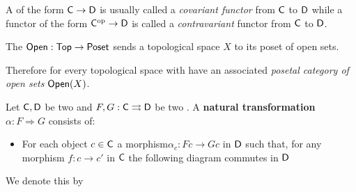 \documentclass[../main.tex]{subfiles}
\begin{document}
\begin{notation}
  A  of the form \(\mathsf{C} \to \mathsf{D}\) is usually called a \textit{covariant functor} from \(\mathsf{C}\) to \(\mathsf{D}\) while a functor of the form \(\mathsf{C}^{\operatorname*{op}} \to \mathsf{D}\) is called a \textit{contravariant} functor from \(\mathsf{C}\) to \(\mathsf{D}\).
\end{notation}


\begin{example} \label{ex:open-set-category}
  The  \(\mathsf{Open}: \mathsf{Top} \to \mathsf{Poset}\) sends a topological space \(X\) to its poset of open sets.

  Therefore for every topological space with have an associated \textit{posetal category of open sets} \(\mathsf{Open}(X)\).
\end{example}


\begin{definition} \label{def:natural-transformation}
  Let \(\mathsf{C}, \mathsf{D}\) be two  and \(F, G: \mathsf{C} \rightrightarrows \mathsf{D}\) be two .
  A \textbf{natural transformation} \(\alpha: F \Rightarrow G\) consists of:
  \begin{itemize}
    \item For each object \(c \in \mathsf{C}\) a morphism\(\alpha_{c}: Fc \to Gc\) in \(\mathsf{D}\) such that, for any morphism \(f: c \to c'\) in \(\mathsf{C}\) the following diagram commutes in \(\mathsf{D}\)
          \begin{center}
          \end{center}
  \end{itemize}

  We denote this by
  \begin{center}
  \end{center}
\end{definition}
\end{document}
